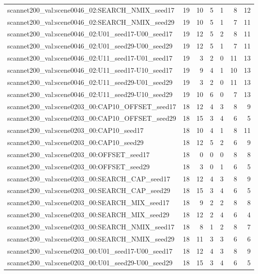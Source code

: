 \begin{table}[t]
\begin{tabular}{lrrrrrr}
scannet200\_val:scene0046\_02:SEARCH\_NMIX\_seed17 & 19 & 10 & 5 & 1 & 8 & 12 \\
scannet200\_val:scene0046\_02:SEARCH\_NMIX\_seed29 & 19 & 10 & 5 & 1 & 7 & 11 \\
scannet200\_val:scene0046\_02:U01\_seed17-U00\_seed17 & 19 & 12 & 5 & 2 & 8 & 11 \\
scannet200\_val:scene0046\_02:U01\_seed29-U00\_seed29 & 19 & 12 & 5 & 1 & 7 & 11 \\
scannet200\_val:scene0046\_02:U11\_seed17-U01\_seed17 & 19 & 3 & 2 & 0 & 11 & 13 \\
scannet200\_val:scene0046\_02:U11\_seed17-U10\_seed17 & 19 & 9 & 4 & 1 & 10 & 13 \\
scannet200\_val:scene0046\_02:U11\_seed29-U01\_seed29 & 19 & 3 & 2 & 0 & 11 & 13 \\
scannet200\_val:scene0046\_02:U11\_seed29-U10\_seed29 & 19 & 10 & 6 & 0 & 7 & 13 \\
scannet200\_val:scene0203\_00:CAP10\_OFFSET\_seed17 & 18 & 12 & 4 & 3 & 8 & 9 \\
scannet200\_val:scene0203\_00:CAP10\_OFFSET\_seed29 & 18 & 15 & 3 & 4 & 6 & 5 \\
scannet200\_val:scene0203\_00:CAP10\_seed17 & 18 & 10 & 4 & 1 & 8 & 11 \\
scannet200\_val:scene0203\_00:CAP10\_seed29 & 18 & 12 & 5 & 2 & 6 & 9 \\
scannet200\_val:scene0203\_00:OFFSET\_seed17 & 18 & 0 & 0 & 0 & 8 & 8 \\
scannet200\_val:scene0203\_00:OFFSET\_seed29 & 18 & 3 & 0 & 1 & 6 & 5 \\
scannet200\_val:scene0203\_00:SEARCH\_CAP\_seed17 & 18 & 12 & 4 & 3 & 8 & 9 \\
scannet200\_val:scene0203\_00:SEARCH\_CAP\_seed29 & 18 & 15 & 3 & 4 & 6 & 5 \\
scannet200\_val:scene0203\_00:SEARCH\_MIX\_seed17 & 18 & 9 & 2 & 2 & 8 & 8 \\
scannet200\_val:scene0203\_00:SEARCH\_MIX\_seed29 & 18 & 12 & 2 & 4 & 6 & 4 \\
scannet200\_val:scene0203\_00:SEARCH\_NMIX\_seed17 & 18 & 8 & 1 & 2 & 8 & 7 \\
scannet200\_val:scene0203\_00:SEARCH\_NMIX\_seed29 & 18 & 11 & 3 & 3 & 6 & 6 \\
scannet200\_val:scene0203\_00:U01\_seed17-U00\_seed17 & 18 & 12 & 4 & 3 & 8 & 9 \\
scannet200\_val:scene0203\_00:U01\_seed29-U00\_seed29 & 18 & 15 & 3 & 4 & 6 & 5 \\

\end{tabular}
\end{table}
